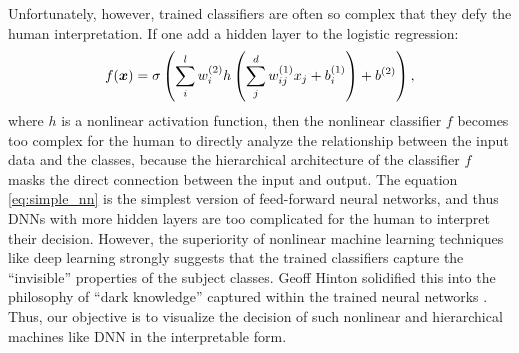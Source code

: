 %
Unfortunately, however, trained classifiers are often so complex that
they defy the human interpretation.
%
If one add a hidden layer to the logistic regression:
\begin{equation}
 \label{eq:simple_nn}
f(\mbox{\boldmath $x$}) = \sigma \left(\sum_{i}^{l} w_{i}^{(2)} h
\left(\sum_{j}^{d} w_{ij}^{(1)} x_{j} + b_{i}^{(1)}\right) +
b^{(2)}\right),
\end{equation}
where $h$ is a nonlinear activation function,
then the nonlinear classifier $f$ becomes too complex for the human to
directly analyze the relationship between the input data and the classes,
because the hierarchical architecture of the classifier $f$ masks the
direct connection between the input and output.
%
The equation \eqref{eq:simple_nn} is the simplest version of
feed-forward neural networks, and thus DNNs with more hidden layers are
too complicated for the human to interpret their decision.
%
However, the superiority of nonlinear machine learning techniques like deep
learning \cite{krizhevsky2012imagenet,seide2011conversational,DeepFace} strongly suggests that the trained classifiers
capture the ``invisible'' properties of the subject classes.
%
Geoff Hinton solidified this into the philosophy of
``dark knowledge'' captured within the trained neural networks \cite{DarkKnowledge}.
%
Thus, our objective is to visualize the decision of such nonlinear and hierarchical machines like DNN
in the interpretable form.

